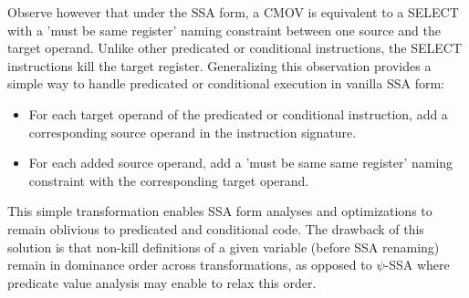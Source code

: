 Observe however that under the SSA form, a CMOV is equivalent to a SELECT with a
'must be same register' naming constraint between one source and the target
operand. Unlike other predicated or conditional instructions, the SELECT
instructions kill the target register.  Generalizing this observation provides a
simple way to handle predicated or conditional execution in vanilla SSA form:
\begin{itemize}

\item For each target operand of the predicated or conditional instruction, add
a corresponding source operand in the instruction signature.

\item For each added source operand, add a 'must be same same register' naming
constraint with the corresponding target operand.

\end{itemize}
This simple transformation enables SSA form analyses and optimizations to remain
oblivious to predicated and conditional code. The drawback of this solution is
that non-kill definitions of a given variable (before SSA renaming) remain in
dominance order across transformations, as opposed to $\psi$-SSA where predicate
value analysis may enable to relax this order.

%
%
%
%
%
%

%
%

